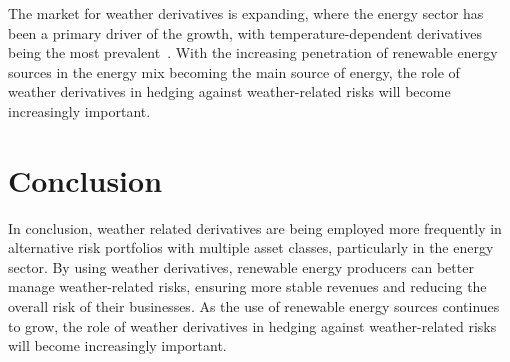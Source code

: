     The market for weather derivatives is expanding, where the energy sector has been a primary driver of the growth,
    with temperature-dependent derivatives being the most prevalent~\cite{ali_pricing_2023}.
    With the increasing penetration of renewable energy sources in the energy mix becoming the main source of energy,
    the role of weather derivatives in hedging against weather-related risks will become increasingly important.




%

\section{Conclusion}
\label{sec:weather_conclusion}

    In conclusion, weather related derivatives are being employed more frequently in alternative risk portfolios with
    multiple asset classes, particularly in the energy sector.
    By using weather derivatives, renewable energy producers can better manage weather-related risks,
    ensuring more stable revenues and reducing the overall risk of their businesses.
    As the use of renewable energy sources continues to grow,
    the role of weather derivatives in hedging against weather-related risks will become increasingly important.





